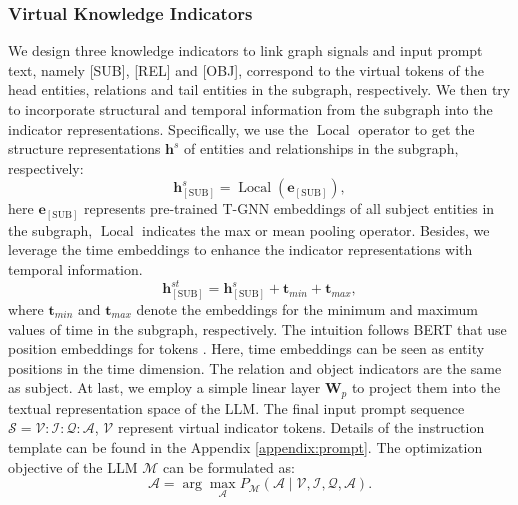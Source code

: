 \documentclass[11pt]{article}
\begin{document}
\subsubsection{Virtual Knowledge Indicators}

We design three knowledge indicators to link graph signals and input prompt text, namely [SUB], [REL] and [OBJ], correspond to the virtual tokens of the head entities, relations and tail entities in the subgraph, respectively. 
We then try to incorporate structural and temporal information from the subgraph into the indicator representations.
Specifically, we use the $\operatorname{Local}$ operator to get the structure representations $\mathbf{h}^{s}$ of entities and relationships in the subgraph, respectively:
\begin{equation}
\mathbf{h}_{\operatorname{[SUB]}}^{s}=\operatorname{Local}(\mathbf{e}_{\operatorname{[SUB]}}),
\end{equation}
here $\mathbf{e}_{\operatorname{[SUB]}}$ represents pre-trained T-GNN embeddings of all subject entities in the subgraph, $\operatorname{Local}$ indicates the  max or mean pooling operator.
Besides, we leverage the time embeddings to enhance the indicator representations with temporal information. 
\begin{equation}\label{eq:6}
\mathbf{h}_{\operatorname{[SUB]}}^{st}=\mathbf{h}_{\operatorname{[SUB]}}^{s}+\mathbf{t}_{min}+\mathbf{t}_{max},
\end{equation}
where $\mathbf{t}_{min}$ and $\mathbf{t}_{max}$ denote the embeddings for the minimum and maximum values of time in the subgraph, respectively. 
The intuition follows BERT that use position embeddings for tokens \cite{BERT}. Here, time embeddings can be seen as entity positions in the time dimension.
The relation and object indicators are the same as subject.
At last, we employ a simple linear layer $\mathbf{W}_{p}$ to project them into the textual representation space of the LLM. The final input prompt sequence $\mathcal{S} = \mathcal{V}:\mathcal{I}:\mathcal{Q}:\mathcal{A}$, $\mathcal{V}$ represent virtual indicator tokens.
Details of the instruction template can be found in the Appendix \ref{appendix:prompt}.
The optimization objective of the LLM $\mathcal{M}$ can be formulated as:
\begin{equation}
\mathcal{A}=\arg \max _{\mathcal{A}} P_{\mathcal{M}}\left(\mathcal{A} \mid \mathcal{V}, \mathcal{I}, \mathcal{Q}, \mathcal{A}\right).
\end{equation}
\end{document}
